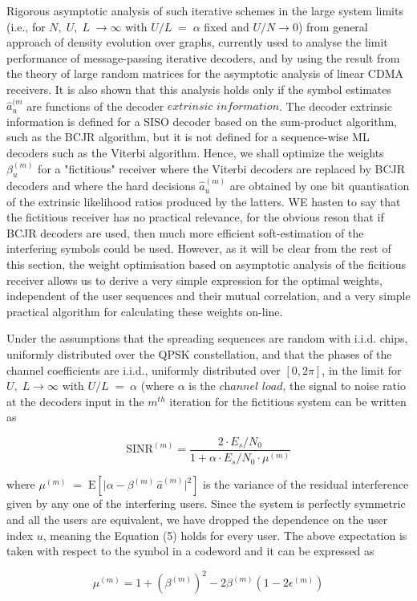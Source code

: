 \documentclass[a4paper,10pt]{article}
\begin{document}
Rigorous asymptotic analysis of such iterative schemes in the large system limits (i.e., for $N,\;U,\;L\; \rightarrow \infty$ with $U/L\;=\;\alpha$ fixed and $U/N\rightarrow 0$) from general approach of density evolution over graphs, currently used to analyse the limit performance of message-passing iterative decoders, and by using the result from the theory of large random matrices for the asymptotic analysis of linear CDMA receivers. It is also shown that this analysis holds only if the symbol estimates $\hat{a}_u^{(m}$ are functions of the decoder $\textit{extrinsic information}$. The decoder extrinsic information is defined for a SISO decoder based on the sum-product algorithm, such as the BCJR algorithm, but it is not defined for a sequence-wise ML decoders such as the Viterbi algorithm. Hence, we shall optimize the weights $\beta_u^{(m)}$ for a "fictitious" receiver where the Viterbi decoders are replaced by BCJR decoders and where the hard decisions $\hat{a}_u^{(m)}$ are obtained by one bit quantisation of the extrinsic likelihood ratios produced by the latters. WE hasten to say that the fictitious receiver has no practical relevance, for the obvious reson that if BCJR decoders are used, then much more efficient soft-estimation of the interfering symbols could be used. However, as it will be clear from the rest of this section, the weight optimisation based on asymptotic analysis of the ficitious receiver allows us to derive a very simple expression for the optimal weights, independent of the user sequences and their mutual correlation, and a very simple practical algorithm for calculating these weights on-line.

Under the assumptions that the spreading sequences are random with i.i.d. chips, uniformly distributed over the QPSK constellation, and that the phases of the channel coefficients are i.i.d., uniformly distributed over $[0,2\pi]$, in the limit for $U,\;L \rightarrow \infty$ with $U/L\;=\;\alpha$ (where $\alpha$ is the $\textit{channel load}$, the signal to noise ratio at the decoders input in the $m^{th}$ iteration for the fictitious system can be written as

\begin{equation}
\mathrm{SINR}^{(m)}= \frac{2\cdot E_s/N_0}{1+\alpha\cdot E_s/N_0 \cdot \mu^{(m)}}
\end{equation}

where $\mu^{(m)}\;=\;\mathrm{E}[\vert \alpha - \beta^{(m)}\, \hat{a}^{(m)}\vert ^2]$ is the variance of the residual interference given by any one of the interfering users. Since the system is perfectly symmetric and all the users are equivalent, we have dropped the dependence on the user index $u$, meaning the Equation (5) holds for every user. The above expectation is taken with respect to the symbol in a codeword and it can be expressed as 

\begin{equation}
\mu^{(m)}= 1 + \left ( \beta^{(m)} \right )^2 - 2\beta^{(m)} \left (1-2\epsilon^{(m)} \right )
\end{equation}
\end{document}

